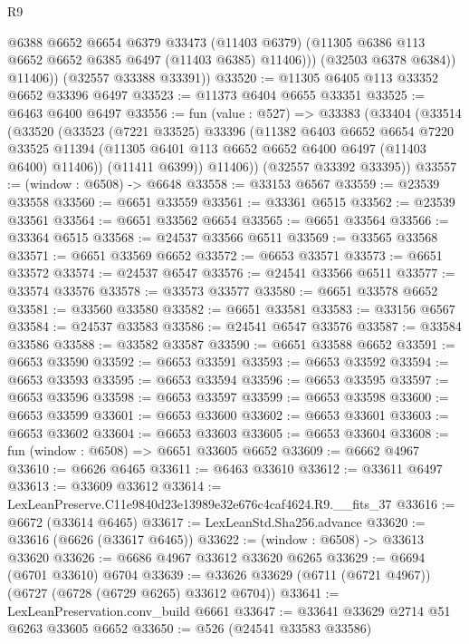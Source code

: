 \begin{lexlean}{R9}
\begin{coremodule}
                @6388
                @6652
                @6654
                @6379
                @33473
                (@11403 @6379)
                (@11305 @6386 @113 @6652 @6652 @6385 @6497 (@11403 @6385) @11406)))
            (@32503 @6378 @6384))
          @11406))
      (@32557 @33388 @33391))
@33520 := @11305 @6405 @113 @33352 @6652 @33396 @6497
@33523 := @11373 @6404 @6655 @33351
@33525 := @6463 @6400 @6497
@33556 := fun (value : @527) =>
  @33383
    (@33404
      (@33514
        (@33520
          (@33523
            (@7221 @33525)
            @33396
            (@11382
              @6403
              @6652
              @6654
              @7220
              @33525
              @11394
              (@11305 @6401 @113 @6652 @6652 @6400 @6497 (@11403 @6400) @11406))
            (@11411 @6399))
          @11406))
      (@32557 @33392 @33395))
@33557 := (window : @6508) -> @6648
@33558 := @33153 @6567
@33559 := @23539 @33558
@33560 := @6651 @33559
@33561 := @33361 @6515
@33562 := @23539 @33561
@33564 := @6651 @33562 @6654
@33565 := @6651 @33564
@33566 := @33364 @6515
@33568 := @24537 @33566 @6511
@33569 := @33565 @33568
@33571 := @6651 @33569 @6652
@33572 := @6653 @33571
@33573 := @6651 @33572
@33574 := @24537 @6547
@33576 := @24541 @33566 @6511
@33577 := @33574 @33576
@33578 := @33573 @33577
@33580 := @6651 @33578 @6652
@33581 := @33560 @33580
@33582 := @6651 @33581
@33583 := @33156 @6567
@33584 := @24537 @33583
@33586 := @24541 @6547 @33576
@33587 := @33584 @33586
@33588 := @33582 @33587
@33590 := @6651 @33588 @6652
@33591 := @6653 @33590
@33592 := @6653 @33591
@33593 := @6653 @33592
@33594 := @6653 @33593
@33595 := @6653 @33594
@33596 := @6653 @33595
@33597 := @6653 @33596
@33598 := @6653 @33597
@33599 := @6653 @33598
@33600 := @6653 @33599
@33601 := @6653 @33600
@33602 := @6653 @33601
@33603 := @6653 @33602
@33604 := @6653 @33603
@33605 := @6653 @33604
@33608 := fun (window : @6508) => @6651 @33605 @6652
@33609 := @6662 @4967
@33610 := @6626 @6465
@33611 := @6463 @33610
@33612 := @33611 @6497
@33613 := @33609 @33612
@33614 := LexLeanPreserve.C11e9840d23e13989e32e676c4caf4624.R9.__fits_37
@33616 := @6672 (@33614 @6465)
@33617 := LexLeanStd.Sha256.advance
@33620 := @33616 (@6626 (@33617 @6465))
@33622 := (window : @6508) -> @33613 @33620
@33626 := @6686 @4967 @33612 @33620 @6265
@33629 := @6694 (@6701 @33610) @6704
@33639 := @33626 @33629 (@6711 (@6721 @4967)) (@6727 (@6728 (@6729 @6265) @33612 @6704))
@33641 := LexLeanPreservation.conv_build @6661
@33647 := @33641 @33629 @2714 @51 @6263 @33605 @6652
@33650 := @526 (@24541 @33583 @33586)

\end{coremodule}
\end{lexlean}
